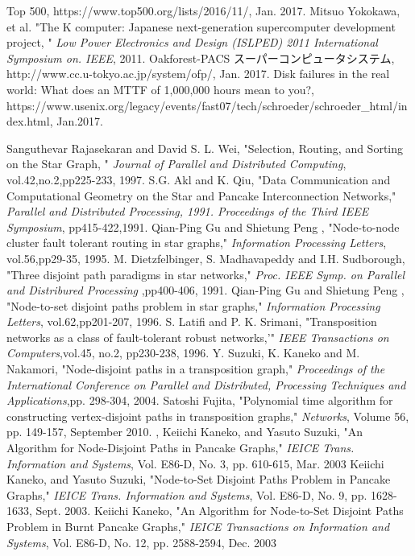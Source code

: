 \documentclass[11pt,a4j]{jsarticle}
\theoremstyle{plain}
\begin{document}
\begin{thebibliography}{9}
Top 500, https://www.top500.org/lists/2016/11/, Jan. 2017.
Mitsuo Yokokawa, et al. "The K computer: Japanese next-generation supercomputer development project, " {\it Low Power Electronics and Design (ISLPED) 2011 International Symposium on. IEEE}, 2011.
Oakforest-PACS スーパーコンピュータシステム, http://www.cc.u-tokyo.ac.jp/system/ofp/, Jan. 2017.
Disk failures in the real world: What does an MTTF of 1,000,000 hours mean to you?, https://www.usenix.org/legacy/events/fast07/tech/schroeder/schroeder\_html/index.html, Jan.2017.


 Sanguthevar Rajasekaran and David S. L. Wei, "Selection, Routing, and Sorting on the Star Graph,	"  {\it Journal of Parallel and Distributed Computing}, {vol.42},{no.2},pp225-233, 1997.
S.G. Akl and K. Qiu, "Data Communication and Computational Geometry on the Star and Pancake Interconnection Networks," {\it Parallel and Distributed Processing, 1991. Proceedings of the Third IEEE Symposium}, pp415-422,1991.
 Qian-Ping Gu and Shietung Peng , "Node-to-node cluster fault tolerant routing in star graphs," {\it Information Processing Letters}, {vol.56},pp29-35, 1995.
 M. Dietzfelbinger, S. Madhavapeddy and I.H. Sudborough, "Three disjoint path paradigms in star networks,"  {\it Proc. IEEE Symp. on Parallel and Distribured Processing} ,pp400-406, 1991.
 Qian-Ping Gu and Shietung Peng , "Node-to-set disjoint paths problem in star graphs,"  {\it Information Processing Letters}, {vol.62},pp201-207, 1996.
S. Latifi and P. K. Srimani, "Transposition networks as a class of fault-tolerant robust networks,'" {\it IEEE Transactions on Computers},{vol.45, no.2}, pp230-238, 1996.
Y. Suzuki, K. Kaneko and M. Nakamori, "Node-disjoint paths in a transposition graph," {\it Proceedings of the International Conference on Parallel and Distributed, Processing Techniques and Applications},pp. 298-304,  2004. 
Satoshi Fujita, "Polynomial time algorithm for constructing vertex-disjoint paths in transposition graphs," {\it Networks}, Volume 56,  pp. 149-157, September 2010. 
 , Keiichi Kaneko, and Yasuto Suzuki, "An Algorithm for Node-Disjoint Paths in Pancake Graphs," {\it IEICE Trans. Information and Systems}, Vol. E86-D, No. 3, pp. 610-615, Mar. 2003
 Keiichi Kaneko, and Yasuto Suzuki, "Node-to-Set Disjoint Paths Problem in Pancake Graphs," {\it IEICE Trans. Information and Systems}, Vol. E86-D, No. 9, pp. 1628-1633, Sept. 2003.
Keiichi Kaneko, "An Algorithm for Node-to-Set Disjoint Paths Problem in Burnt Pancake Graphs," {\it IEICE Transactions on Information and Systems}, Vol. E86-D, No. 12, pp. 2588-2594, Dec. 2003
\end{thebibliography}
\end{document}
